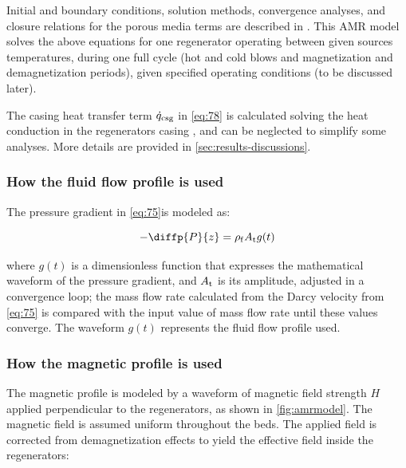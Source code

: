 \documentclass[referee]{svjour3}
\begin{document}
Initial and boundary conditions, solution methods, convergence analyses, and closure relations for the porous media terms are described in \cite{bib:trevizoli16_perfor_model}. This AMR model solves the above equations for one regenerator operating between given sources temperatures, during one full cycle (hot and cold blows and  magnetization and demagnetization periods), given specified operating conditions (to be discussed later).

The casing heat transfer term $\dot{q}_{\mathrm{csg}}$ in \autoref{eq:78} is calculated solving the heat conduction in the regenerators casing \cite{bib:trevizoli16_perfor_model}, and can be neglected to simplify some analyses. More details are provided in \autoref{sec:results-discussions}.

\subsubsection{How the fluid flow profile is used}
\label{sec:how-fluid-flow}

The pressure gradient in \autoref{eq:75}is modeled as:

\begin{equation}
\label{eq:76}
-\diffp{P}{z} = \rho\ped{f} A\ped{t} g(t)
\end{equation}

\noindent where \(g(t)\) is a dimensionless function that expresses the mathematical waveform of the pressure gradient, and  \(A_{\mathrm{t}}\) is its amplitude,  adjusted in a convergence loop; the mass flow rate calculated from the Darcy velocity from \autoref{eq:75} is compared with the input value of mass flow rate until these values converge. The waveform $g(t)$ represents the fluid flow profile used.



\subsubsection{How the magnetic profile is used}
\label{sec:how-magnetic-profile}


The magnetic profile is modeled by a waveform of magnetic field strength $H$ applied perpendicular to the regenerators, as shown in \autoref{fig:amrmodel}. The magnetic field is assumed uniform throughout the beds. The applied field is corrected from demagnetization effects to yield the effective field inside the regenerators:
\end{document}
